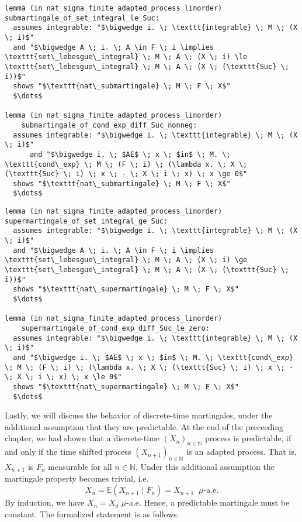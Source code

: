 \begin{isalemma}
{\small
\begin{lstlisting}[style=isabelle]
lemma (in nat_sigma_finite_adapted_process_linorder) submartingale_of_set_integral_le_Suc:
  assumes integrable: "$\bigwedge i. \; \texttt{integrable} \; M \; (X \; i)$" 
  and "$\bigwedge A \; i. \; A \in F \; i \implies \texttt{set\_lebesgue\_integral} \; M \; A \; (X \; i) \le \texttt{set\_lebesgue\_integral} \; M \; A \; (X \; (\texttt{Suc} \; i))$" 
  shows "$\texttt{nat\_submartingale} \; M \; F \; X$"
  $\dots$
  
lemma (in nat_sigma_finite_adapted_process_linorder) 
	submartingale_of_cond_exp_diff_Suc_nonneg:
  assumes integrable: "$\bigwedge i. \; \texttt{integrable} \; M \; (X \; i)$" 
      and "$\bigwedge i. \; $AE$ \; x \; $in$ \; M. \; \texttt{cond\_exp} \; M \; (F \; i) \; (\lambda x. \; X \; (\texttt{Suc} \; i) \; x \; - \; X \; i \; x) \; x \ge 0$" 
  shows "$\texttt{nat\_submartingale} \; M \; F \; X$"
  $\dots$
\end{lstlisting}
}
\end{isalemma}

\begin{isalemma}
{\small
\begin{lstlisting}[style=isabelle]
lemma (in nat_sigma_finite_adapted_process_linorder) supermartingale_of_set_integral_ge_Suc:
  assumes integrable: "$\bigwedge i. \; \texttt{integrable} \; M \; (X \; i)$" 
  and "$\bigwedge A \; i. \; A \in F \; i \implies \texttt{set\_lebesgue\_integral} \; M \; A \; (X \; i) \ge \texttt{set\_lebesgue\_integral} \; M \; A \; (X \; (\texttt{Suc} \; i))$" 
  shows "$\texttt{nat\_supermartingale} \; M \; F \; X$"
  $\dots$
  
lemma (in nat_sigma_finite_adapted_process_linorder) 
	supermartingale_of_cond_exp_diff_Suc_le_zero:
  assumes integrable: "$\bigwedge i. \; \texttt{integrable} \; M \; (X \; i)$" 
  and "$\bigwedge i. \; $AE$ \; x \; $in$ \; M. \; \texttt{cond\_exp} \; M \; (F \; i) \; (\lambda x. \; X \; (\texttt{Suc} \; i) \; x \; - \; X \; i \; x) \; x \le 0$" 
  shows "$\texttt{nat\_supermartingale} \; M \; F \; X$"
  $\dots$
\end{lstlisting}
}
\end{isalemma}

Lastly, we will discuss the behavior of discrete-time martingales, under the additional assumption that they are predictable. At the end of the preceeding chapter, we had shown that a discrete-time $(X_n)_{n \in \mathbb{N}}$ process is predictable, if and only if the time shifted process $(X_{n + 1})_{n \in \mathbb{N}}$ is an adapted process. That is, $X_{n+1}$ is $F_n$ measurable for all $n \in \mathbb{N}$. Under this additional assumption the martingale property becomes trivial, i.e.
\[
	X_n = \mathbb{E}(X_{n+1} \;\vert\; F_n) = X_{n+1} \;\;\mu\textrm{-a.e.}
\]
By induction, we have $X_n = X_0$ $\mu$-a.e. Hence, a predictable martingale must be constant. The formalized statement is as follows.

